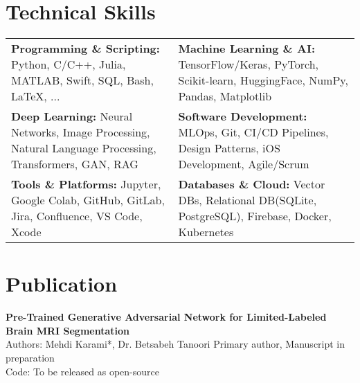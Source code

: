 \documentclass[letter,10pt]{article}
\newcommand{\customsquare}{\raisebox{0.25ex}{\scalebox{0.45}{$\blacksquare$}}}
\begin{document}
\section*{Technical Skills}
\begin{tabularx}{\textwidth}{@{}X X@{}}
\customsquare\hspace{2mm}\textbf{Programming \& Scripting:} Python, C/C++, Julia, MATLAB, Swift, SQL, Bash, LaTeX, ... & 
\customsquare\hspace{2mm}\textbf{Machine Learning \& AI:} TensorFlow/Keras, PyTorch, Scikit-learn, HuggingFace, NumPy, Pandas, Matplotlib \\
\vspace{-1mm}
\customsquare\hspace{2mm}\textbf{Deep Learning:} Neural Networks, Image Processing, Natural Language Processing, Transformers, GAN, RAG &
\vspace{-1mm}
\customsquare\hspace{2mm}\textbf{Software Development:} MLOps, Git, CI/CD Pipelines, Design Patterns, iOS Development, Agile/Scrum \\
\vspace{-1mm}
\customsquare\hspace{2mm}\textbf{Tools \& Platforms:} Jupyter, Google Colab, GitHub, GitLab, Jira, Confluence, VS Code, Xcode &
\vspace{-1mm}
\customsquare\hspace{2mm}\textbf{Databases \& Cloud:} Vector DBs, Relational DB(SQLite, PostgreSQL), Firebase, Docker, Kubernetes
\end{tabularx}

\section*{Publication}
\textbf{Pre-Trained Generative Adversarial Network for Limited-Labeled Brain MRI Segmentation} \\ [5pt]
Authors: Mehdi Karami*, Dr. Betsabeh Tanoori \hfill *Primary author, Manuscript in preparation \\
Code: To be released as open-source

\end{document}
